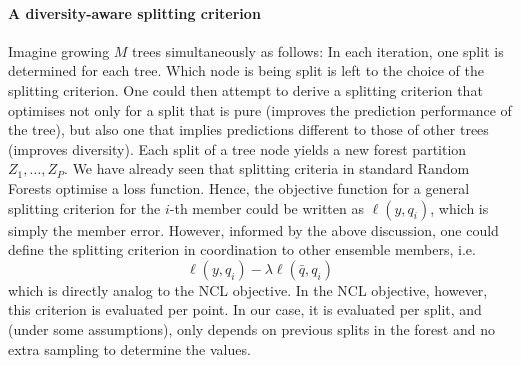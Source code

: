 \documentclass[
	twoside=false, %
]{kaobook}
\begin{document}
\paragraph{A diversity-aware splitting criterion} Imagine growing $M$ trees simultaneously as follows: In each iteration, one split is determined for each tree. Which node is being split is left to the choice of the splitting criterion. 
One could then attempt to derive a splitting criterion that optimises not only for a split that is pure (improves the prediction performance of the tree), but also one that implies predictions different to those of other trees (improves diversity). Each split of a tree node yields a new forest partition $Z_{1}, \dots, Z_{P}$. 
We have already seen that splitting criteria in standard Random Forests optimise a loss function. Hence, the objective function for a general splitting criterion for the $i$-th member could be written as  $\ell(y, q_{i})$, which is simply the member error. However, informed by the above discussion, one could define the splitting criterion in coordination to other ensemble members, i.e.
$$
\ell(y, q_{i}) - \lambda \ell(\bar{q}, q_{i})
$$
which is directly analog to the NCL objective. In the NCL objective, however, this criterion is evaluated per point. In our case, it is evaluated per split, and (under some assumptions), only depends on previous splits in the forest and no extra sampling to determine the values.
\end{document}
